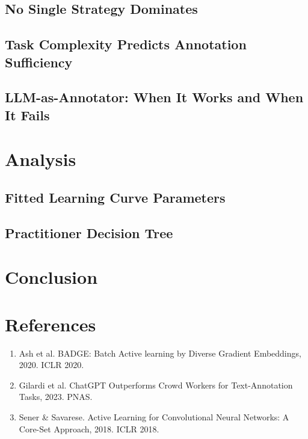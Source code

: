 \documentclass{article}
\begin{document}
\subsection{No Single Strategy Dominates}
\subsection{Task Complexity Predicts Annotation Sufficiency}
\subsection{LLM-as-Annotator: When It Works and When It Fails}

\section{Analysis}
\subsection{Fitted Learning Curve Parameters}
\subsection{Practitioner Decision Tree}

\section{Conclusion}

\section*{References}
\small
\begin{enumerate}
    \item Ash et al. BADGE: Batch Active learning by Diverse Gradient Embeddings, 2020. ICLR 2020.
    \item Gilardi et al. ChatGPT Outperforms Crowd Workers for Text-Annotation Tasks, 2023. PNAS.
    \item Sener \& Savarese. Active Learning for Convolutional Neural Networks: A Core-Set Approach, 2018. ICLR 2018.
\end{enumerate}
\end{document}

